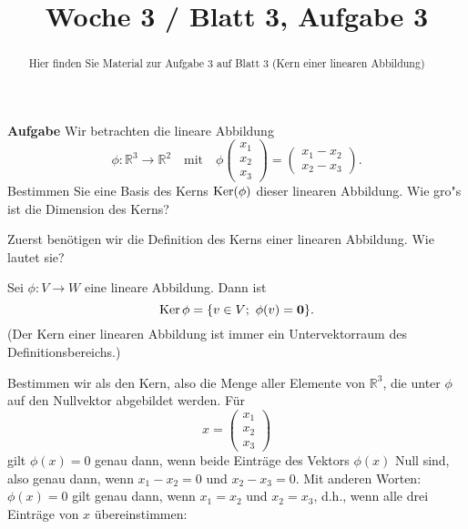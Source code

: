 \documentclass{ximera}
\title{Woche 3 / Blatt 3, Aufgabe 3}
\begin{document}
\begin{abstract}
Hier finden Sie Material zur Aufgabe 3 auf Blatt 3 (Kern einer linearen Abbildung)
\end{abstract}
\maketitle

\textbf{Aufgabe}
Wir betrachten die lineare Abbildung
\[ \phi: \mathbb R^3 \to \mathbb R^2 \quad \mbox{mit} \quad
\phi \left(\begin{array}{c}
x_1\\x_2\\x_3 
\end{array}  \right) = 
\left( \begin{array}{c}
   x_1-x_2\\x_2-x_3 
\end{array}   \right). \]
Bestimmen Sie eine Basis des Kerns $\mathop{\rm Ker}(\phi)$ dieser linearen
Abbildung. Wie gro"s ist die Dimension des Kerns?


\begin{question}
Zuerst benötigen wir die Definition des Kerns einer linearen Abbildung. Wie lautet sie?
\begin{solution}
    \begin{free-response}
        Sei $\phi\colon V \rightarrow W$ eine lineare Abbildung. Dann ist 
\[
\mathop{\rm Ker} \phi = \{ v\in V;\ \phi(v) = \mathbf{0} \}.
\]
(Der Kern einer linearen Abbildung ist immer ein Untervektorraum des Definitionsbereichs.)
    \end{free-response}
\end{solution}
\end{question}


Bestimmen wir als den Kern, also die Menge aller Elemente von $\mathbb R^3$, die unter $\phi$ auf den Nullvektor abgebildet werden. Für 
\[
x= \left(\begin{array}{c}
x_1\\x_2\\x_3 
\end{array}  \right)
\]
gilt $\phi(x) = 0$ genau dann, wenn beide Einträge des Vektors $\phi(x)$ Null sind, also genau dann, wenn  $x_1 - x_2 = 0$ und $x_2 - x_3 = 0$. Mit anderen Worten: $\phi(x) = 0$ gilt genau dann, wenn $x_1 = x_2$ und $x_2 = x_3$, d.h., wenn alle drei Einträge von $x$ übereinstimmen:
\end{document}

